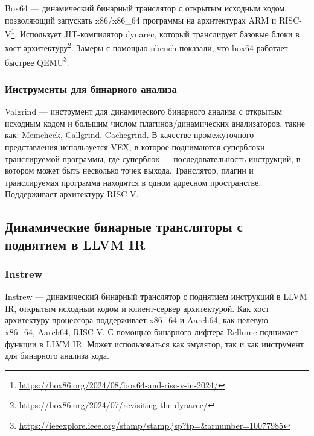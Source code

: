 Box64 --- динамический бинарный транслятор с открытым исходным кодом, позволяющий запускать x86/x86\_64 программы на архитектурах ARM и RISC-V\footnote{\href{https://box86.org/2024/08/box64-and-risc-v-in-2024/}{https://box86.org/2024/08/box64-and-risc-v-in-2024/}}. Использует JIT-компилятор dynarec, который транслирует базовые блоки в хост архитектуру\footnote{\href{https://box86.org/2024/07/revisiting-the-dynarec/}{https://box86.org/2024/07/revisiting-the-dynarec/}}. Замеры с помощью nbench показали, что box64 работает быстрее QEMU\footnote{\href{https://ieeexplore.ieee.org/stamp/stamp.jsp?tp=\&arnumber=10077985}{https://ieeexplore.ieee.org/stamp/stamp.jsp?tp=\&arnumber=10077985}}.
\subsubsection{Инструменты для бинарного анализа}
Valgrind --- инструмент для динамического бинарного анализа с открытым исходным кодом и большим числом плагинов/динамических анализаторов, такие как: Memcheck, Callgrind, Cachegrind. В качестве промежуточного представления используется VEX, в которое поднимаются суперблоки транслируемой программы, где суперблок --- последовательность инструкций, в котором может быть несколько точек выхода\cite{10.1145/1250734.1250746}. Транслятор, плагин и транслируемая программа находятся в одном адресном пространстве. Поддерживает архитектуру RISC-V.

\subsection{Динамические бинарные трансляторы с поднятием в LLVM IR}
\subsubsection{Instrew}
Instrew --- динамический бинарный транслятор с поднятием инструкций в LLVM IR, открытым исходным кодом и клиент-сервер архитектурой. Как хост архитектуру процессора поддерживает x86\_64 и Aarch64, как целевую --- x86\_64, Aarch64, RISC-V. С помощью бинарного лифтера Rellume поднимает функции в LLVM IR. Может использоваться как эмулятор, так и как инструмент для бинарного анализа кода\cite{10.1145/3381052.3381319}.
